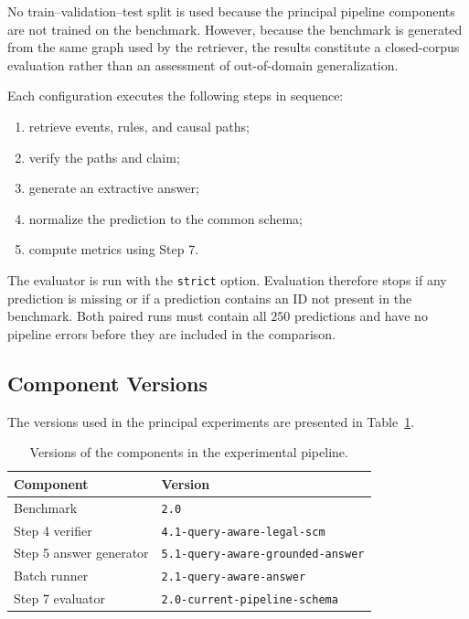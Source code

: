 No train--validation--test split is used because the principal pipeline
components are not trained on the benchmark. However, because the benchmark is
generated from the same graph used by the retriever, the results constitute a
closed-corpus evaluation rather than an assessment of out-of-domain
generalization.

Each configuration executes the following steps in sequence:

\begin{enumerate}
    \item retrieve events, rules, and causal paths;
    \item verify the paths and claim;
    \item generate an extractive answer;
    \item normalize the prediction to the common schema;
    \item compute metrics using Step 7.
\end{enumerate}

The evaluator is run with the \texttt{strict} option. Evaluation therefore
stops if any prediction is missing or if a prediction contains an ID not
present in the benchmark. Both paired runs must contain all \(250\) predictions
and have no pipeline errors before they are included in the comparison.

\subsection{Component Versions}

The versions used in the principal experiments are presented in
Table~\ref{tab:versions}.

\begin{table}[t]
    \centering
    \caption{Versions of the components in the experimental pipeline.}
    \label{tab:versions}
    \begin{tabular}{ll}
        \hline
        \textbf{Component} & \textbf{Version} \\
        \hline
        Benchmark & \texttt{2.0} \\
        Step 4 verifier & \texttt{4.1-query-aware-legal-scm} \\
        Step 5 answer generator & \texttt{5.1-query-aware-grounded-answer} \\
        Batch runner & \texttt{2.1-query-aware-answer} \\
        Step 7 evaluator & \texttt{2.0-current-pipeline-schema} \\
        \hline
    \end{tabular}
\end{table}

